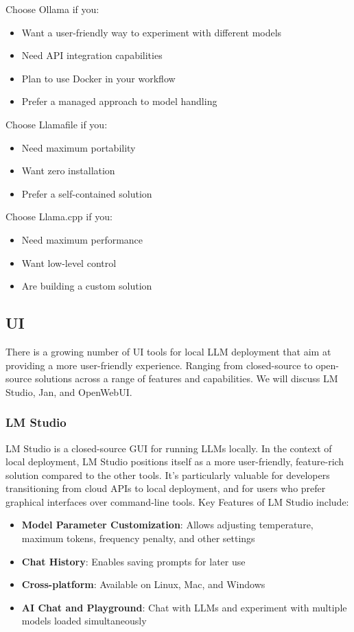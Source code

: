 Choose Ollama if you:
\begin{itemize}
\item Want a user-friendly way to experiment with different models
\item Need API integration capabilities
\item Plan to use Docker in your workflow
\item Prefer a managed approach to model handling
\end{itemize}

Choose Llamafile if you:
\begin{itemize}
\item Need maximum portability
\item Want zero installation
\item Prefer a self-contained solution
\end{itemize}

Choose Llama.cpp if you:
\begin{itemize}
\item Need maximum performance
\item Want low-level control
\item Are building a custom solution
\end{itemize}


\subsection{UI}

There is a growing number of UI tools for local LLM deployment that aim at providing a more user-friendly experience. Ranging from closed-source to open-source solutions across a range of features and capabilities. We will discuss LM Studio, Jan, and OpenWebUI.

\subsubsection{LM Studio}

LM Studio  is a closed-source GUI for running LLMs locally. In the context of local deployment, LM Studio positions itself as a more user-friendly, feature-rich solution compared to the other tools. It's particularly valuable for developers transitioning from cloud APIs to local deployment, and for users who prefer graphical interfaces over command-line tools. Key Features of LM Studio include:

\begin{itemize}
\item \textbf{Model Parameter Customization}: Allows adjusting temperature, maximum tokens, frequency penalty, and other settings
\item \textbf{Chat History}: Enables saving prompts for later use
\item \textbf{Cross-platform}: Available on Linux, Mac, and Windows
\item \textbf{AI Chat and Playground}: Chat with LLMs and experiment with multiple models loaded simultaneously
\end{itemize}

